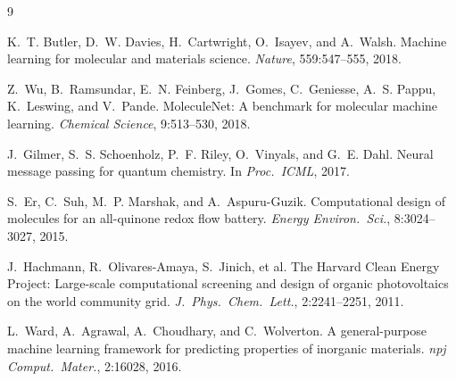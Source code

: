 \documentclass[11pt]{article}
\begin{document}
\begin{thebibliography}{9}

K.~T. Butler, D.~W. Davies, H.~Cartwright, O.~Isayev, and A.~Walsh.
Machine learning for molecular and materials science.
{\em Nature}, 559:547--555, 2018.

Z.~Wu, B.~Ramsundar, E.~N. Feinberg, J.~Gomes, C.~Geniesse, A.~S. Pappu, K.~Leswing, and V.~Pande.
MoleculeNet: A benchmark for molecular machine learning.
{\em Chemical Science}, 9:513--530, 2018.

J.~Gilmer, S.~S. Schoenholz, P.~F. Riley, O.~Vinyals, and G.~E. Dahl.
Neural message passing for quantum chemistry.
In {\em Proc.\ ICML}, 2017.

S.~Er, C.~Suh, M.~P. Marshak, and A.~Aspuru-Guzik.
Computational design of molecules for an all-quinone redox flow battery.
{\em Energy Environ.\ Sci.}, 8:3024--3027, 2015.

J.~Hachmann, R.~Olivares-Amaya, S.~Jinich, et al.
The Harvard Clean Energy Project: Large-scale computational screening and design of organic photovoltaics on the world community grid.
{\em J.\ Phys.\ Chem.\ Lett.}, 2:2241--2251, 2011.

L.~Ward, A.~Agrawal, A.~Choudhary, and C.~Wolverton.
A general-purpose machine learning framework for predicting properties of inorganic materials.
{\em npj Comput.\ Mater.}, 2:16028, 2016.

\end{thebibliography}
\end{document}
